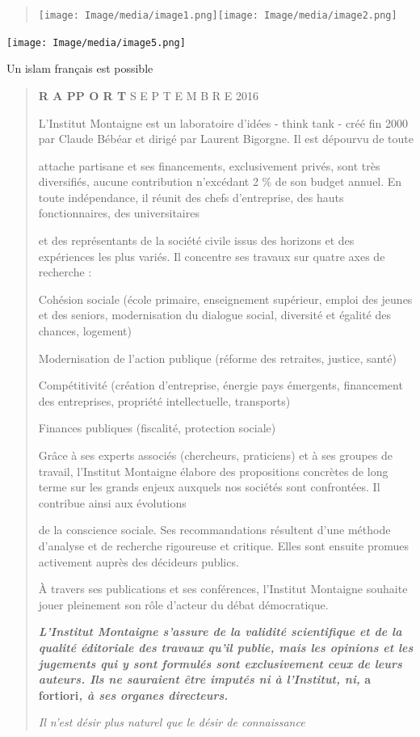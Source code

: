 \begin{quote}
\texttt{[image: Image/media/image1.png]}\texttt{[image: Image/media/image2.png]}
\end{quote}

\texttt{[image: Image/media/image5.png]}

Un islam français est possible

\begin{quote}
\textbf{R A PP O R T} S E P T E M B R E 2016

L'Institut Montaigne est un laboratoire d'idées - think tank - créé fin
2000 par Claude Bébéar et dirigé par Laurent Bigorgne. Il est dépourvu
de toute

attache partisane et ses financements, exclusivement privés, sont très
diversifiés, aucune contribution n'excédant 2 \% de son budget annuel.
En toute indépendance, il réunit des chefs d'entreprise, des hauts
fonctionnaires, des universitaires

et des représentants de la société civile issus des horizons et des
expériences les plus variés. Il concentre ses travaux sur quatre axes de
recherche :

Cohésion sociale (école primaire, enseignement supérieur, emploi des
jeunes et des seniors, modernisation du dialogue social, diversité et
égalité des chances, logement)

Modernisation de l'action publique (réforme des retraites, justice,
santé)

Compétitivité (création d'entreprise, énergie pays émergents,
financement des entreprises, propriété intellectuelle, transports)

Finances publiques (fiscalité, protection sociale)

Grâce à ses experts associés (chercheurs, praticiens) et à ses groupes
de travail, l'Institut Montaigne élabore des propositions concrètes de
long terme sur les grands enjeux auxquels nos sociétés sont confrontées.
Il contribue ainsi aux évolutions

de la conscience sociale. Ses recommandations résultent d'une méthode
d'analyse et de recherche rigoureuse et critique. Elles sont ensuite
promues activement auprès des décideurs publics.

À travers ses publications et ses conférences, l'Institut Montaigne
souhaite jouer pleinement son rôle d'acteur du débat démocratique.

\textbf{\emph{L'Institut Montaigne s'assure de la validité scientifique
et de la qualité éditoriale des travaux qu'il publie, mais les opinions
et les jugements qui y sont formulés sont exclusivement ceux de leurs
auteurs. Ils ne sauraient être imputés ni à l'Institut, ni,} a
fortiori\emph{, à ses organes directeurs.}}

\emph{Il n'est désir plus naturel que le désir de connaissance}
\end{quote}

